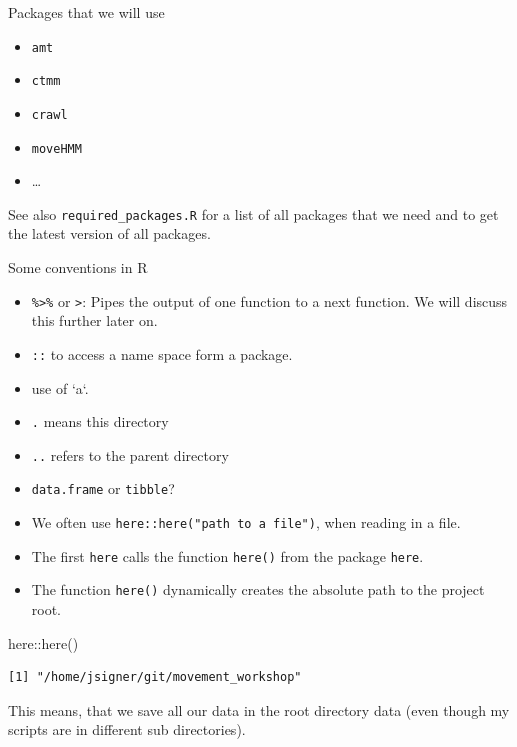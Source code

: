 \documentclass[ignorenonframetext,,t]{beamer}
\providecommand{\tightlist}{%
\setlength{\itemsep}{0pt}\setlength{\parskip}{0pt}}
\newenvironment{Shaded}{\begin{snugshade}}{\end{snugshade}}
\newcommand{\FunctionTok}[1]{\textcolor[rgb]{0.00,0.00,0.00}{#1}}
\newcommand{\NormalTok}[1]{#1}
\newcommand{\SpecialCharTok}[1]{\textcolor[rgb]{0.00,0.00,0.00}{#1}}
\providecommand{\tightlist}{%
\setlength{\itemsep}{0pt}\setlength{\parskip}{0pt}}
\renewcommand{\tightlist}{\setlength{\itemsep}{1.4ex}\setlength{\parskip}{0pt}}
\begin{document}
\begin{frame}[fragile]
\begin{block}{Packages that we will use}
\protect\hypertarget{packages-that-we-will-use}{}
\begin{itemize}
\tightlist
\item
  \texttt{amt}
\item
  \texttt{ctmm}
\item
  \texttt{crawl}
\item
  \texttt{moveHMM}
\item
  \ldots{}
\end{itemize}

See also \texttt{required\_packages.R} for a list of all packages that
we need and to get the latest version of all packages.
\end{block}
\end{frame}

\begin{frame}[fragile]{Some conventions in R}
\protect\hypertarget{some-conventions-in-r}{}
\begin{itemize}
\tightlist
\item
  \texttt{\%\textgreater{}\%} or \texttt{\textbar{}\textgreater{}}:
  Pipes the output of one function to a next function. We will discuss
  this further later on.
\item
  \texttt{::} to access a name space form a package.
\item
  use of `a`.
\item
  \texttt{.} means this directory
\item
  \texttt{..} refers to the parent directory
\item
  \texttt{data.frame} or \texttt{tibble}?
\end{itemize}
\end{frame}

\begin{frame}[fragile]
\begin{itemize}
\tightlist
\item
  We often use \texttt{here::here("path\ to\ a\ file")}, when reading in
  a file.
\item
  The first \texttt{here} calls the function \texttt{here()} from the
  package \texttt{here}.
\item
  The function \texttt{here()} dynamically creates the absolute path to
  the project root.
\end{itemize}

\begin{Shaded}
\begin{Highlighting}[]
\NormalTok{here}\SpecialCharTok{::}\FunctionTok{here}\NormalTok{()}
\end{Highlighting}
\end{Shaded}

\begin{verbatim}
[1] "/home/jsigner/git/movement_workshop"
\end{verbatim}

This means, that we save all our data in the root directory data (even
though my scripts are in different sub directories).
\end{frame}
\end{document}
